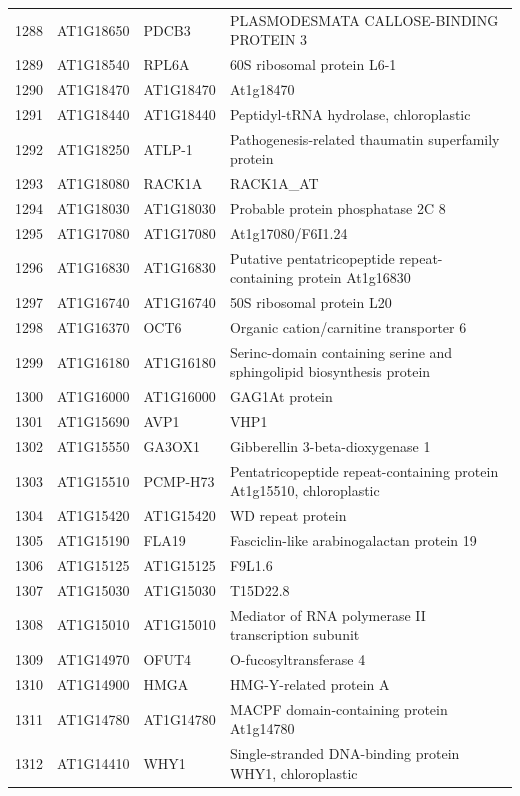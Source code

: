 \documentclass[11pt]{article}
\begin{document}
\begin{center}
\begin{tabular}{rlll}
1288 & AT1G18650 & PDCB3 & PLASMODESMATA CALLOSE-BINDING PROTEIN 3\\
1289 & AT1G18540 & RPL6A & 60S ribosomal protein L6-1\\
1290 & AT1G18470 & AT1G18470 & At1g18470\\
1291 & AT1G18440 & AT1G18440 & Peptidyl-tRNA hydrolase, chloroplastic\\
1292 & AT1G18250 & ATLP-1 & Pathogenesis-related thaumatin superfamily protein\\
1293 & AT1G18080 & RACK1A & RACK1A\_AT\\
1294 & AT1G18030 & AT1G18030 & Probable protein phosphatase 2C 8\\
1295 & AT1G17080 & AT1G17080 & At1g17080/F6I1.24\\
1296 & AT1G16830 & AT1G16830 & Putative pentatricopeptide repeat-containing protein At1g16830\\
1297 & AT1G16740 & AT1G16740 & 50S ribosomal protein L20\\
1298 & AT1G16370 & OCT6 & Organic cation/carnitine transporter 6\\
1299 & AT1G16180 & AT1G16180 & Serinc-domain containing serine and sphingolipid biosynthesis protein\\
1300 & AT1G16000 & AT1G16000 & GAG1At protein\\
1301 & AT1G15690 & AVP1 & VHP1\\
1302 & AT1G15550 & GA3OX1 & Gibberellin 3-beta-dioxygenase 1\\
1303 & AT1G15510 & PCMP-H73 & Pentatricopeptide repeat-containing protein At1g15510, chloroplastic\\
1304 & AT1G15420 & AT1G15420 & WD repeat protein\\
1305 & AT1G15190 & FLA19 & Fasciclin-like arabinogalactan protein 19\\
1306 & AT1G15125 & AT1G15125 & F9L1.6\\
1307 & AT1G15030 & AT1G15030 & T15D22.8\\
1308 & AT1G15010 & AT1G15010 & Mediator of RNA polymerase II transcription subunit\\
1309 & AT1G14970 & OFUT4 & O-fucosyltransferase 4\\
1310 & AT1G14900 & HMGA & HMG-Y-related protein A\\
1311 & AT1G14780 & AT1G14780 & MACPF domain-containing protein At1g14780\\
1312 & AT1G14410 & WHY1 & Single-stranded DNA-binding protein WHY1, chloroplastic\\

\end{tabular}
\end{center}
\end{document}
